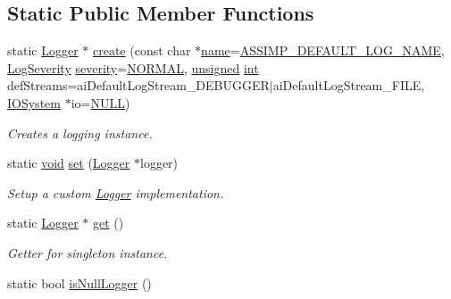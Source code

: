 \subsection*{Static Public Member Functions}
\begin{DoxyCompactItemize}
\item 
static \hyperlink{class_assimp_1_1_logger}{Logger} $\ast$ \hyperlink{class_assimp_1_1_default_logger_adccb11f85f8b0ef226c382e11ba665c3}{create} (const char $\ast$\hyperlink{fmod__codec_8h_a5c4947d4516dd7cfa3505ce3a648a4ef}{name}=\hyperlink{_default_logger_8h_a5e31e6d6c9f8a8954134f3da38fec0a0}{A\-S\-S\-I\-M\-P\-\_\-\-D\-E\-F\-A\-U\-L\-T\-\_\-\-L\-O\-G\-\_\-\-N\-A\-M\-E}, \hyperlink{class_assimp_1_1_logger_a8b6248a0fd062431e8572556350d29e6}{Log\-Severity} \hyperlink{glew_8h_acc39d4387d4f2d172de77ed0c5208990}{severity}=\hyperlink{class_assimp_1_1_logger_a8b6248a0fd062431e8572556350d29e6a79d16f85dc21486ee489f300027e8eda}{N\-O\-R\-M\-A\-L}, \hyperlink{_free_image_8h_a425076c7067a1b5166e2cc530e914814}{unsigned} \hyperlink{wglew_8h_a500a82aecba06f4550f6849b8099ca21}{int} def\-Streams=ai\-Default\-Log\-Stream\-\_\-\-D\-E\-B\-U\-G\-G\-E\-R$\vert$ai\-Default\-Log\-Stream\-\_\-\-F\-I\-L\-E, \hyperlink{class_assimp_1_1_i_o_system}{I\-O\-System} $\ast$io=\hyperlink{ftobjs_8h_a070d2ce7b6bb7e5c05602aa8c308d0c4}{N\-U\-L\-L})
\begin{DoxyCompactList}\small\item\em Creates a logging instance. \end{DoxyCompactList}\item 
static \hyperlink{wglew_8h_aeea6e3dfae3acf232096f57d2d57f084}{void} \hyperlink{class_assimp_1_1_default_logger_a9daba548026045b99813c760c2842ed2}{set} (\hyperlink{class_assimp_1_1_logger}{Logger} $\ast$logger)
\begin{DoxyCompactList}\small\item\em Setup a custom \hyperlink{class_assimp_1_1_logger_a784e6d1a741072b17bab32a6a41055e8}{Logger} implementation. \end{DoxyCompactList}\item 
static \hyperlink{class_assimp_1_1_logger}{Logger} $\ast$ \hyperlink{class_assimp_1_1_default_logger_a7d0a53f2db66945ade30094330a77ba4}{get} ()
\begin{DoxyCompactList}\small\item\em Getter for singleton instance. \end{DoxyCompactList}\item 
static bool \hyperlink{class_assimp_1_1_default_logger_abebc7ee702a2a2dde765e771948400c6}{is\-Null\-Logger} ()

\end{DoxyCompactItemize}
